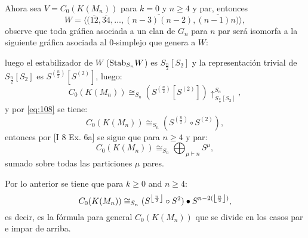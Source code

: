 \documentclass[12pt]{book}
\DeclarePairedDelimiter\floor{\lfloor}{\rfloor}
\theoremstyle{definition}
\newcounter{in}
\begin{document}
  Ahora sea $V = C_{0}(K(M_n))$ para $k=0$ y $n \geq 4$ y par, entonces
  $$W = \langle (\overline{12},\overline{34},\ldots,\overline{(n-3)(n-2)}, \overline{(n-1)n)} \rangle,$$
    observe que toda gráfica asociada a un clan de $G_{n}$ para $n$ par será isomorfa a la siguiente gráfica asociada al $0$-simplejo que genera a $W$:
   \begin{center}
\end{center}
luego el estabilizador de $W$ ($\textup{Stab}_{S_{n}} W$) es $S_{\frac{n}{2}} \left [ S_{2} \right ]$ y la representación trivial de $S_{\frac{n}{2}} \left [ S_{2} \right ]$ es $S^{(\frac{n}{2})} \left [ S^{(2)} \right ]$, luego:
\begin{equation}
C_{0}(K(M_{n})) \cong_{S_{n}} (S^{(\frac{n}{2})} \left [ S^{(2)} \right ])\uparrow_{S_{\frac{n}{2}} \left [ S_{2} \right ]}^{S_{n}},
\end{equation}
y por \ref{eq:108} se tiene:
\begin{equation}
C_{0}(K(M_{n})) \cong_{S_{n}} (S^{(\frac{n}{2})} \circ S^{(2)}),
\end{equation}
entonces por \cite{macdonald1998symmetric} [I 8 Ex. 6a] se sigue que para $n \geq 4$ y par:
\begin{equation}
  \label{eq:97}
   C_{0}(K(M_n)) \cong_{S_{n}} \bigoplus_{\mu \vdash n} S^{\mu},
\end{equation}
sumado sobre todas las particiones $\mu$ pares.



Por lo anterior se tiene que para $k \geq 0$ and $n \geq 4$:
\begin{equation}
  \label{eq:113}
  C_{0}(K(M_n)) \cong_{S_{n}} (S^{\floor*{\frac{n}{2}}} \circ S^{2}) \bullet S^{n-2(\floor*{\frac{n}{2}})},
\end{equation}
es decir, es la fórmula para general $C_{0}(K(M_n))$ que se divide en los casos par e impar de arriba.
\end{document}
